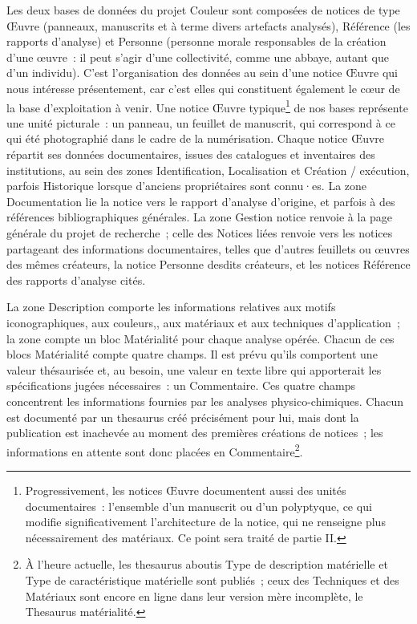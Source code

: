 \documentclass[a4paper,12pt, twoside]{book}
\begin{document}
Les deux bases de données du projet Couleur sont composées de notices de type \textsf{Œuvre} (panneaux, manuscrits et à terme divers artefacts analysés), \textsf{Référence} (les rapports d’analyse) et \textsf{Personne} (personne morale responsables de la création d’une œuvre~: il peut s’agir d’une collectivité, comme une abbaye, autant que d’un individu). C’est l’organisation des données au sein d’une notice \textsf{Œuvre} qui nous intéresse présentement, car c’est elles qui constituent également le cœur de la base d’exploitation à venir. Une notice \textsf{Œuvre} typique\footnote{Progressivement, les notices Œuvre documentent aussi des unités documentaires~: l’ensemble d’un manuscrit ou d’un polyptyque, ce qui modifie significativement l’architecture de la notice, qui ne renseigne plus nécessairement des matériaux. Ce point sera traité de partie II.} de nos bases représente une unité picturale~: un panneau, un feuillet de manuscrit, qui correspond à ce qui été photographié dans le cadre de la numérisation. Chaque notice \textsf{Œuvre} répartit ses données documentaires, issues des catalogues et inventaires des institutions, au sein des zones \textsf{Identification, Localisation} et \textsf{Création / exécution}, parfois \textsf{Historique} lorsque d’anciens propriétaires sont connu·es. La zone \textsf{Documentation} lie la notice vers le rapport d’analyse d’origine, et parfois à des références bibliographiques générales. La zone \textsf{Gestion notice} renvoie à la page générale du projet de recherche~; celle des \textsf{Notices liées} renvoie vers les notices partageant des informations documentaires, telles que d’autres feuillets ou œuvres des mêmes créateurs, la notice \textsf{Personne} desdits créateurs, et les notices \textsf{Référence} des rapports d’analyse cités.

La zone \textsf{Description} comporte les informations relatives aux motifs iconographiques, aux couleurs,, aux matériaux et aux techniques d’application~; la zone compte un bloc \textsf{Matérialité} pour chaque analyse opérée. Chacun de ces blocs \textsf{Matérialité} compte quatre champs. Il est prévu qu’ils comportent une valeur thésaurisée et, au besoin, une valeur en texte libre qui apporterait les spécifications jugées nécessaires~: un \textsf{Commentaire}. Ces quatre champs concentrent les informations fournies par les analyses physico-chimiques. Chacun est documenté par un thesaurus créé précisément pour lui, mais dont la publication est inachevée au moment des premières créations de notices~; les informations en attente sont donc placées en \textsf{Commentaire}\footnote{À l’heure actuelle, les thesaurus aboutis \textsf{Type de description matérielle} et \textsf{Type de caractéristique matérielle} sont publiés~; ceux des \textsf{Techniques} et des \textsf{Matériaux} sont encore en ligne dans leur version mère incomplète, le \textsf{Thesaurus matérialité}.}.
\end{document}
